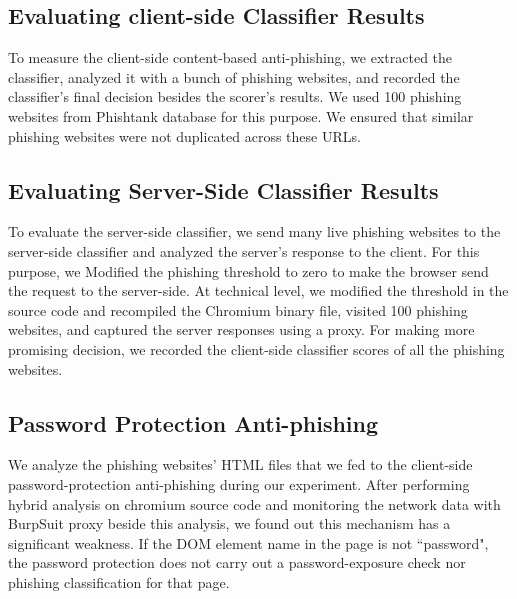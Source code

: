 \documentclass[letterpaper,twocolumn,10pt]{article}
\begin{document}
\subsection{Evaluating client-side Classifier Results}
To measure the client-side content-based anti-phishing, we extracted the classifier, analyzed it with a bunch of phishing websites, and recorded the classifier's final decision besides the scorer's results.
We used 100 phishing websites from Phishtank database for this purpose.
We ensured that similar phishing websites were not duplicated across these URLs.


\subsection{Evaluating Server-Side Classifier Results}
To evaluate the server-side classifier, we send many live phishing websites to the server-side classifier and analyzed the server's response to the client. For this purpose, we Modified the phishing threshold to zero to make the browser send the request to the server-side. At technical level,  we modified the threshold in the source code and recompiled the Chromium binary file, visited 100 phishing websites, and captured the server responses using a proxy. For making more promising decision, we recorded the client-side classifier scores of all the phishing websites.

\subsection{Password Protection Anti-phishing}
We analyze the phishing websites' HTML files that we fed to the client-side password-protection anti-phishing during our experiment. After performing hybrid analysis on chromium source code and monitoring the network data with BurpSuit proxy beside this analysis, we found out this mechanism has a significant weakness. If the DOM element name in the page is not ``password", the password protection does not carry out a password-exposure check nor phishing classification for that page.  
\end{document}
